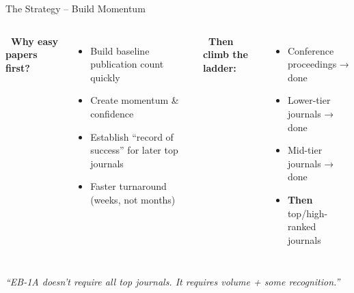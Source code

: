 \documentclass[aspectratio=169, 10pt]{beamer}
\begin{document}
	\begin{frame}{The Strategy -- Build Momentum}
		\begin{columns}[T]
			\textbf{\faChartLine \ Why easy papers first?}
			\begin{itemize}
				\item Build baseline publication count quickly
				\item Create momentum \& confidence
				\item Establish ``record of success'' for later top journals
				\item Faster turnaround (weeks, not months)
			\end{itemize}
			
			\textbf{\faArrowUp \ Then climb the ladder:}
			\begin{itemize}
				\item Conference proceedings → done
				\item Lower-tier journals → done
				\item Mid-tier journals → done
				\item \textbf{Then} top/high-ranked journals
			\end{itemize}
		\end{columns}
		
		\vspace{0.3cm}
		\centering
		\textcolor{accentgold}{\textit{``EB-1A doesn't require all top journals. It requires volume + some recognition.''}}
	\end{frame}
	
\end{document}
